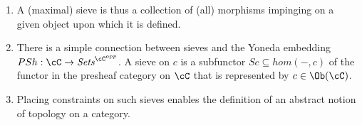 \begin{frame}
\begin{enumerate}
\item A (maximal) sieve is thus a collection of (all) morphisms impinging on a given object upon which it is defined. 
\item There is a simple connection between sieves and the Yoneda embedding $PSh:\cC \rightarrow \textit{Sets}^{\cC^{opp}}$. A sieve on $c$ is a subfunctor $Sc \subseteq hom(-,c)$ of the functor in the presheaf category on $\cC$ that is represented by $c \in \Ob(\cC)$. 
\item Placing constraints on such sieves enables the definition of an abstract notion of topology on a category.
\end{enumerate}
\end{frame}
